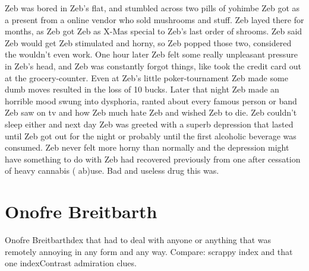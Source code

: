 \documentclass[12pt]{book}
\begin{document}
Zeb was bored in Zeb's flat, and stumbled across two pills of yohimbe Zeb got as a present from a online vendor who sold mushrooms and stuff. Zeb layed there for months, as Zeb got Zeb as X-Mas special to Zeb's last order of shrooms. Zeb said Zeb would get Zeb stimulated and horny, so Zeb popped those two, considered the wouldn't even work. One hour later Zeb felt some really unpleasant pressure in Zeb's head, and Zeb was constantly forgot things, like took the credit card out at the grocery-counter. Even at Zeb's little poker-tournament Zeb made some dumb moves resulted in the loss of 10 bucks. Later that night Zeb made an horrible mood swung into dysphoria, ranted about every famous person or band Zeb saw on tv and how Zeb much hate Zeb and wished Zeb to die. Zeb couldn't sleep either and next day Zeb was greeted with a superb depression that lasted until Zeb got out for the night or probably until the first alcoholic beverage was consumed. Zeb never felt more horny than normally and the depression might have something to do with Zeb had recovered previously from one after cessation of heavy cannabis ( ab)use. Bad and useless drug this was.



\chapter{Onofre Breitbarth}

Onofre Breitbarthdex that had to deal with anyone or anything that was remotely annoying in any form and any way. Compare: scrappy index and that one indexContrast admiration clues.
\end{document}
